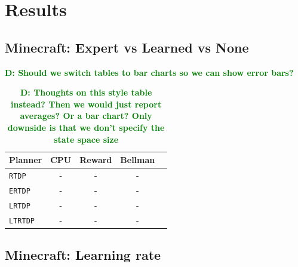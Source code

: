 \documentclass[conference]{IEEEtran}
\newcommand{\dnote}[1]{\textcolor{Green}{\textbf{D: #1}}}
\begin{document}
\section{Results}
\label{sec:results}

\subsection{Minecraft: Expert vs Learned vs None}

\dnote{Should we switch tables to bar charts so we can show error bars?}


\begin{table}[H]
\centering
\begin{tabular}{ l  || c c c c}
  Planner 				&	CPU	&	Reward 	& Bellman \\ \hline
  \texttt{RTDP}  			& 	-	&	-		&	-		\\
  \texttt{ERTDP}  		& 	-	&	-		&	-		\\
  \texttt{LRTDP}  		& 	-	&	-		&	-		\\
  \texttt{LTRTDP}  		& 	-	&	-		&	-		\\
\end{tabular}
\caption{\dnote{Thoughts on this style table instead? Then we would just report averages? Or a bar chart? Only downside is that we don't specify the state space size}}
\label{table:minecraft_results_bellman}
\end{table}


\subsection{Minecraft: Learning rate}
\end{document}
